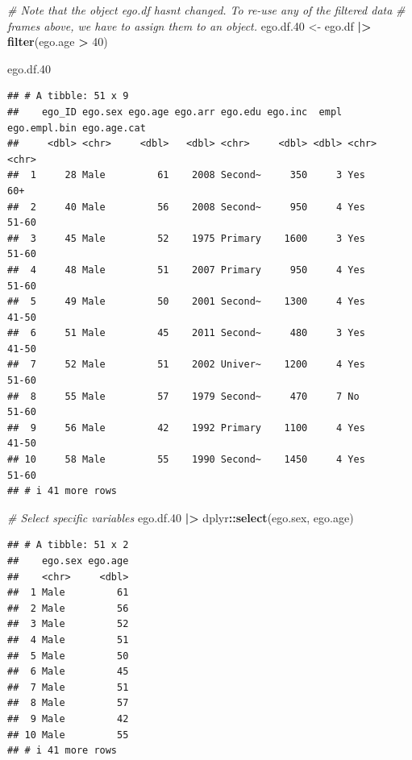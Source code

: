 \documentclass[
]{book}
\newenvironment{Shaded}{\begin{snugshade}}{\end{snugshade}}
\newcommand{\CommentTok}[1]{\textcolor[rgb]{0.56,0.35,0.01}{\textit{#1}}}
\newcommand{\DecValTok}[1]{\textcolor[rgb]{0.00,0.00,0.81}{#1}}
\newcommand{\FloatTok}[1]{\textcolor[rgb]{0.00,0.00,0.81}{#1}}
\newcommand{\FunctionTok}[1]{\textcolor[rgb]{0.13,0.29,0.53}{\textbf{#1}}}
\newcommand{\NormalTok}[1]{#1}
\newcommand{\OtherTok}[1]{\textcolor[rgb]{0.56,0.35,0.01}{#1}}
\newcommand{\SpecialCharTok}[1]{\textcolor[rgb]{0.81,0.36,0.00}{\textbf{#1}}}
\begin{document}
\begin{Shaded}
\begin{Highlighting}[]
\CommentTok{\# Note that the object ego.df hasn\textquotesingle{}t changed. To re{-}use any of the filtered data}
\CommentTok{\# frames above, we have to assign them to an object.}
\NormalTok{ego.df}\FloatTok{.40} \OtherTok{\textless{}{-}}\NormalTok{ ego.df }\SpecialCharTok{|\textgreater{}} 
  \FunctionTok{filter}\NormalTok{(ego.age }\SpecialCharTok{\textgreater{}} \DecValTok{40}\NormalTok{)}

\NormalTok{ego.df}\FloatTok{.40}
\end{Highlighting}
\end{Shaded}

\begin{verbatim}
## # A tibble: 51 x 9
##    ego_ID ego.sex ego.age ego.arr ego.edu ego.inc  empl ego.empl.bin ego.age.cat
##     <dbl> <chr>     <dbl>   <dbl> <chr>     <dbl> <dbl> <chr>        <chr>      
##  1     28 Male         61    2008 Second~     350     3 Yes          60+        
##  2     40 Male         56    2008 Second~     950     4 Yes          51-60      
##  3     45 Male         52    1975 Primary    1600     3 Yes          51-60      
##  4     48 Male         51    2007 Primary     950     4 Yes          51-60      
##  5     49 Male         50    2001 Second~    1300     4 Yes          41-50      
##  6     51 Male         45    2011 Second~     480     3 Yes          41-50      
##  7     52 Male         51    2002 Univer~    1200     4 Yes          51-60      
##  8     55 Male         57    1979 Second~     470     7 No           51-60      
##  9     56 Male         42    1992 Primary    1100     4 Yes          41-50      
## 10     58 Male         55    1990 Second~    1450     4 Yes          51-60      
## # i 41 more rows
\end{verbatim}

\begin{Shaded}
\begin{Highlighting}[]
\CommentTok{\# Select specific variables}
\NormalTok{ego.df}\FloatTok{.40} \SpecialCharTok{|\textgreater{}}
\NormalTok{  dplyr}\SpecialCharTok{::}\FunctionTok{select}\NormalTok{(ego.sex, ego.age)}
\end{Highlighting}
\end{Shaded}

\begin{verbatim}
## # A tibble: 51 x 2
##    ego.sex ego.age
##    <chr>     <dbl>
##  1 Male         61
##  2 Male         56
##  3 Male         52
##  4 Male         51
##  5 Male         50
##  6 Male         45
##  7 Male         51
##  8 Male         57
##  9 Male         42
## 10 Male         55
## # i 41 more rows
\end{verbatim}
\end{document}

